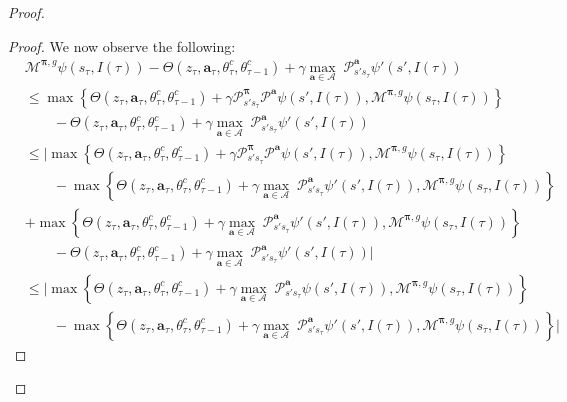 \documentclass{article}
\begin{document}
\begin{proof}
\begin{proof}
We now observe the following:
\begin{align*}
&\mathcal{M}^{\boldsymbol{\pi},g}\psi(s_{\tau},I(\tau))-\Theta(z_\tau,\boldsymbol{a}_\tau,\theta^c_{\tau},\theta^c_{\tau-1})+\gamma\underset{\boldsymbol{a}\in\boldsymbol{\mathcal{A}}}{\max}\;\mathcal{P}^{\boldsymbol{a}}_{s's_\tau}\psi'(s',I(\tau))
\\&\leq\max\left\{\Theta(z_\tau,\boldsymbol{a}_\tau,\theta^c_{\tau},\theta^c_{\tau-1})+\gamma\mathcal{P}^{\boldsymbol{\pi}}_{s's_\tau}\mathcal{P}^{\boldsymbol{a}}\psi(s',I({\tau})),\mathcal{M}^{\boldsymbol{\pi},g}\psi(s_{\tau},I(\tau))\right\}
\\&\qquad-\Theta(z_\tau,\boldsymbol{a}_\tau,\theta^c_{\tau},\theta^c_{\tau-1})+\gamma\underset{\boldsymbol{a}\in\boldsymbol{\mathcal{A}}}{\max}\;\mathcal{P}^{\boldsymbol{a}}_{s's_\tau}\psi'(s',I(\tau))
\\&\leq \Bigg|\max\left\{\Theta(z_\tau,\boldsymbol{a}_\tau,\theta^c_{\tau},\theta^c_{\tau-1})+\gamma\mathcal{P}^{\boldsymbol{\pi}}_{s's_\tau}\mathcal{P}^{\boldsymbol{a}}\psi(s',I({\tau})),\mathcal{M}^{\boldsymbol{\pi},g}\psi(s_{\tau},I(\tau))\right\}
\\&\qquad-\max\left\{\Theta(z_\tau,\boldsymbol{a}_\tau,\theta^c_{\tau},\theta^c_{\tau-1})+\gamma\underset{\boldsymbol{a}\in\boldsymbol{\mathcal{A}}}{\max}\;\mathcal{P}^{\boldsymbol{a}}_{s's_\tau}\psi'(s',I({\tau})),\mathcal{M}^{\boldsymbol{\pi},g}\psi(s_{\tau},I(\tau))\right\}
\\&+\max\left\{\Theta(z_\tau,\boldsymbol{a}_\tau,\theta^c_{\tau},\theta^c_{\tau-1})+\gamma\underset{\boldsymbol{a}\in\boldsymbol{\mathcal{A}}}{\max}\;\mathcal{P}^{\boldsymbol{a}}_{s's_\tau}\psi'(s',I({\tau})),\mathcal{M}^{\boldsymbol{\pi},g}\psi(s_{\tau},I(\tau))\right\}
\\&\qquad-\Theta(z_\tau,\boldsymbol{a}_\tau,\theta^c_{\tau},\theta^c_{\tau-1})+\gamma\underset{\boldsymbol{a}\in\boldsymbol{\mathcal{A}}}{\max}\;\mathcal{P}^{\boldsymbol{a}}_{s's_\tau}\psi'(s',I(\tau))\Bigg|
\\&\leq \Bigg|\max\left\{\Theta(z_\tau,\boldsymbol{a}_\tau,\theta^c_{\tau},\theta^c_{\tau-1})+\gamma\underset{\boldsymbol{a}\in\boldsymbol{\mathcal{A}}}{\max}\;\mathcal{P}^{\boldsymbol{a}}_{s's_\tau}\psi(s',I({\tau})),\mathcal{M}^{\boldsymbol{\pi},g}\psi(s_{\tau},I(\tau))\right\}
\\&\qquad-\max\left\{\Theta(z_\tau,\boldsymbol{a}_\tau,\theta^c_{\tau},\theta^c_{\tau-1})+\gamma\underset{\boldsymbol{a}\in\boldsymbol{\mathcal{A}}}{\max}\;\mathcal{P}^{\boldsymbol{a}}_{s's_\tau}\psi'(s',I({\tau})),\mathcal{M}^{\boldsymbol{\pi},g}\psi(s_{\tau},I(\tau))\right\}\Bigg|

\end{align*}
\end{proof}
\end{proof}
\end{document}
